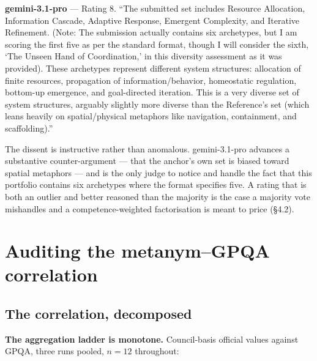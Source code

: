 \documentclass{article}
\begin{document}
\textbf{gemini-3.1-pro} --- Rating 8. ``The submitted set includes Resource Allocation, Information Cascade, Adaptive Response, Emergent Complexity, and Iterative Refinement. (Note: The submission actually contains six archetypes, but I am scoring the first five as per the standard format, though I will consider the sixth, `The Unseen Hand of Coordination,' in this diversity assessment as it was provided). These archetypes represent different system structures: allocation of finite resources, propagation of information/behavior, homeostatic regulation, bottom-up emergence, and goal-directed iteration. This is a very diverse set of system structures, arguably slightly more diverse than the Reference's set (which leans heavily on spatial/physical metaphors like navigation, containment, and scaffolding).''

The dissent is instructive rather than anomalous. gemini-3.1-pro advances a substantive counter-argument --- that the anchor's own set is biased toward spatial metaphors --- and is the only judge to notice and handle the fact that this portfolio contains six archetypes where the format specifies five. A rating that is both an outlier and better reasoned than the majority is the case a majority vote mishandles and a competence-weighted factorisation is meant to price (\S{}4.2).

\section{Auditing the metanym--GPQA correlation}\label{auditing-the-metanymgpqa-correlation}

\subsection{The correlation, decomposed}\label{the-correlation-decomposed}

\textbf{The aggregation ladder is monotone.} Council-basis official values against GPQA, three runs pooled, \(n = 12\) throughout:
\end{document}
